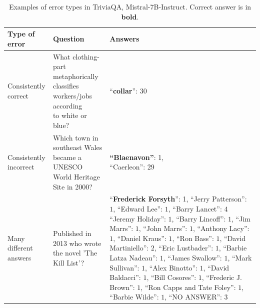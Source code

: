 \begin{table}[h]
\centering
\caption{Examples of error types in TriviaQA, Mistral-7B-Instruct. Correct answer is in \textbf{bold}.}
\begin{tabular}{|l|l|l|}
\toprule
\textbf{Type of error} & \textbf{Question} & \textbf{Answers} \\
\midrule
\makecell[l]{Consistently \\ correct} & \makecell[l]{What clothing-part metaphorically \\ classifies workers/jobs according\\ to white or blue?} & ``\textbf{collar}'': $30$ \\
\midrule
\makecell[l]{Consistently \\ incorrect} & \makecell[l]{Which town in southeast Wales \\ became a UNESCO World Heritage \\ Site in 2000?
} & \makecell[l]{\textbf{``Blaenavon''}: 1, \\ ``Caerleon'': 29} \\
\midrule
\makecell[l]{Many different \\ answers}	&\makecell[l]{Published in 2013 who wrote \\ the novel 'The Kill List'?}  &\makecell[l]{``\textbf{Frederick Forsyth}'': 1, \\ ``Jerry Patterson'': $1$,\\ ``Edward Lee'': $1$,  \\ ``Barry Lancet'': $4$ \\``Jeremy Holiday'': $1$, \\ ``Barry Lincoff'': $1$, \\ ``Jim Marrs'': $1$, \\ ``John Marrs'': $1$, \\ ``Anthony Lacy'': $1$, \\ ``Daniel Kraus'': $1$, \\``Ron Bass'': $1$, \\ ``David Martiniello'': $2$, \\ ``Eric Lustbader'': $1$, \\ ``Barbie Latza Nadeau'': $1$, \\ ``James Swallow'': $1$, \\ ``Mark Sullivan'': $1$, \\ ``Alex Binotto'': $1$, \\ ``David Baldacci'': $1$, \\ ``Bill Cosores'': $1$, \\ ``Frederic J. Brown'': $1$, \\ ``Ron Capps and Tate Foley'': $1$, \\ ``Barbie Wilde'': $1$, \\ ``NO ANSWER'': $3$} \\

\end{tabular}
\end{table}
